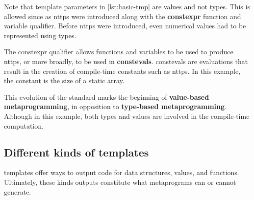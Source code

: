 \documentclass[../main]{subfiles}
\begin{document}
Note that template parameters in \ref{lst:basic-tmp} are values and not types.
This is allowed since  as \glspl{nttp} were introduced along with
the \textbf{\gls{constexpr}} function and variable qualifier.
Before \glspl{nttp} were introduced, even numerical values
had to be represented using types.

The \gls{constexpr} qualifier allows functions and variables to be used to
produce \glspl{nttp}, or more broadly, to be used in \textbf{\glspl{consteval}}.
\Glspl{consteval} are evaluations that result in the creation of
compile-time constants such as \glspl{nttp}.
In this example, the constant is the size of a static array.

This evolution of the \cpp standard marks the beginning of
\textbf{value-based metaprogramming}, in opposition to
\textbf{type-based metaprogramming}. Although in this example, both types
and values are involved in the compile-time computation.

\subsection{
  Different kinds of templates
}

\cpp templates offer ways to output code for data structures, values,
and functions. Ultimately, these kinds outputs constitute what metaprograms
can or cannot generate.
\end{document}
